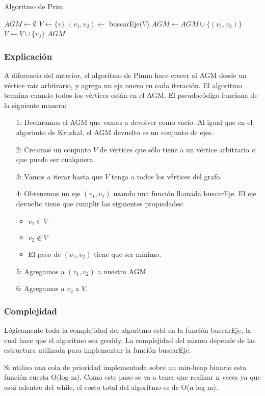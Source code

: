 \begin{algorithm}
\caption{Algoritmo de Prim}
\begin{algorithmic}[1]
\State $AGM \gets \emptyset$
\State $V \gets \{ v \}$
  \State $(v_1, v_2) \gets$ buscarEje($V$)
  \State $AGM \gets AGM \cup \{ (v_1, v_2) \}$
  \State $V \gets V \cup \{ v_2 \}$
\EndWhile
\Return $AGM$
\end{algorithmic}
\end{algorithm}

\subsubsection*{Explicaci\'on}

A diferencia del anterior, el algoritmo de Pimm hace crecer al AGM desde un v\'ertice raiz arbitrario, y agrega un eje nuevo en cada iteraci\'on. El algoritmo termina cuando todos los v\'ertices est\'an en el AGM. El pseudoc\'odigo funciona de la siguiente manera:

\begin{enumerate}
\item [1:] Declaramos el AGM que vamos a devolver como vac\'io. Al igual que en el algorimto de Kruskal, el AGM devuelto es un conjunto de ejes.
\item [2:] Creamos un conjunto $V$ de v\'ertices que s\'olo tiene a un v\'ertice arbitrario $v$, que puede ser cualquiera.
\item [3:] Vamos a iterar hasta que $V$ tenga a todos los v\'ertices del grafo.
\item [4:] Obtenemos un eje $(v_1, v_2)$ usando una funci\'on llamada buscarEje. El eje devuelto tiene que cumplir las siguientes propiedades:
  \begin{itemize}
  \item $v_1 \in V$
  \item $v_2 \not \in V$
  \item El peso de $(v_1, v_2)$ tiene que ser m\'inimo.
  \end{itemize}
\item [5:] Agregamos a $(v_1, v_2)$ a nuestro AGM.
\item [6:] Agregamos a $v_2$ a $V$.
\end{enumerate}

\subsubsection*{Complejidad}

L\'ogicamente toda la complejidad del algoritmo est\'a en la funci\'on buscarEje, la cual hace que el algoritmo sea greddy. La complejidad del mismo depende de las estructura utilizada para implementar la funci\'on buscarEje.

Si utilizo una cola de prioridad implementada sobre un min-heap binario esta funci\'on cuesta O(log m). Como este paso se va a tener que realizar n veces ya que est\'a adentro del while, el costo total del algoritmo es de O(n log m).